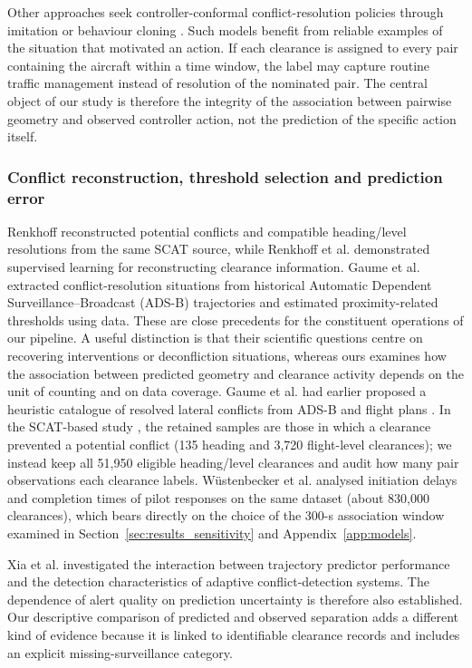 \documentclass[aerospace,article,submit,moreauthors]{Definitions/mdpi}
\begin{document}
Other approaches seek controller-conformal conflict-resolution policies through imitation or behaviour cloning \cite{guleria2024}. Such models benefit from reliable examples of the situation that motivated an action. If each clearance is assigned to every pair containing the aircraft within a time window, the label may capture routine traffic management instead of resolution of the nominated pair. The central object of our study is therefore the integrity of the association between pairwise geometry and observed controller action, not the prediction of the specific action itself.

\subsubsection{Conflict reconstruction, threshold selection and prediction error}
Renkhoff \cite{renkhoff2025} reconstructed potential conflicts and compatible heading/level resolutions from the same SCAT source, while Renkhoff et al. \cite{renkhoff2026} demonstrated supervised learning for reconstructing clearance information. Gaume et al. \cite{gaume2025} extracted conflict-resolution situations from historical Automatic Dependent Surveillance--Broadcast (ADS-B) trajectories and estimated proximity-related thresholds using data. These are close precedents for the constituent operations of our pipeline. A useful distinction is that their scientific questions centre on recovering interventions or deconfliction situations, whereas ours examines how the association between predicted geometry and clearance activity depends on the unit of counting and on data coverage. Gaume et al. had earlier proposed a heuristic catalogue of resolved lateral conflicts from ADS-B and flight plans \cite{gaume2023}. In the SCAT-based study \cite{renkhoff2025}, the retained samples are those in which a clearance prevented a potential conflict (135 heading and 3,720 flight-level clearances); we instead keep all 51,950 eligible heading/level clearances and audit how many pair observations each clearance labels. Wüstenbecker et al. \cite{wustenbecker2025} analysed initiation delays and completion times of pilot responses on the same dataset (about 830,000 clearances), which bears directly on the choice of the 300-s association window examined in Section~\ref{sec:results_sensitivity} and Appendix~\ref{app:models}.

Xia et al. \cite{xia2024} investigated the interaction between trajectory predictor performance and the detection characteristics of adaptive conflict-detection systems. The dependence of alert quality on prediction uncertainty is therefore also established. Our descriptive comparison of predicted and observed separation adds a different kind of evidence because it is linked to identifiable clearance records and includes an explicit missing-surveillance category.
\end{document}
